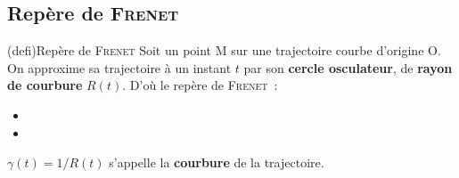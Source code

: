 \documentclass[../../main/main.tex]{subfiles}
\begin{document}
\vspace*{-20pt}

\subsection{Repère de \textsc{Frenet}}

\begin{tcb*}[sidebyside, righthand ratio=.4](defi){Repère de \textsc{Frenet}}
	Soit un point M sur une trajectoire courbe d'origine O. On approxime sa
	trajectoire à un instant $t$ par son \textbf{cercle osculateur}, de
	\textbf{rayon de courbure} $R(t)$. D'où le repère de \textsc{Frenet}~:
	\begin{itemize}
		\item {}
		\item {}%
	\end{itemize}
	$\gamma(t) = 1/R(t)$ s'appelle la \textbf{courbure} de
	la trajectoire.
	\tcblower
	\begin{center}
		\vspace{-15pt}
	\end{center}
\end{tcb*}
\end{document}
